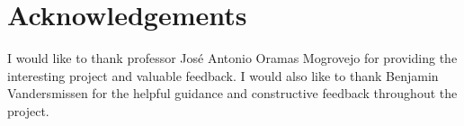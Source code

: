 \chapter*{Acknowledgements}

I would like to thank professor José Antonio Oramas Mogrovejo for providing the interesting project and valuable feedback. I would also like to thank Benjamin Vandersmissen for the helpful guidance and constructive feedback throughout the project.
